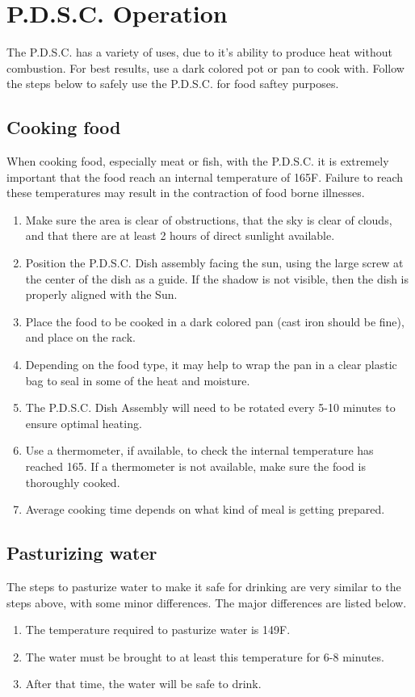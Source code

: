 \documentclass[titlepage]{article}
\begin{document}
    \section{P.D.S.C. Operation}
        The P.D.S.C. has a variety of uses, due to it's ability to produce heat without combustion.  For best results, use a dark colored pot or pan to cook with.
        Follow the steps below to safely use the P.D.S.C. for food saftey purposes.

        \subsection{Cooking food}
        When cooking food, especially meat or fish, with the P.D.S.C. it is extremely important that the food reach an internal temperature of 165\degree F.  Failure to reach these temperatures
        may result in the contraction of food borne illnesses.
            \begin{enumerate}
                \item Make sure the area is clear of obstructions, that the sky is clear of clouds, and that there are at least 2 hours of direct sunlight available.
                \item Position the P.D.S.C. Dish assembly facing the sun, using the large screw at the center of the dish as a guide.  If the shadow is not visible, then the dish is properly aligned with the Sun.
                \item Place the food to be cooked in a dark colored pan (cast iron should be fine), and place on the rack.
                \item Depending on the food type, it may help to wrap the pan in a clear plastic bag to seal in some of the heat and moisture.
                \item The P.D.S.C. Dish Assembly will need to be rotated every 5-10 minutes to ensure optimal heating.
                \item Use a thermometer, if available, to check the internal temperature has reached 165\degree.  If a thermometer is not available, make sure the food is thoroughly cooked.
                \item Average cooking time depends on what kind of meal is getting prepared.
            \end{enumerate}
        \subsection{Pasturizing water}
        The steps to pasturize water to make it safe for drinking are very similar to the steps above, with some minor differences.
        The major differences are listed below.
            \begin{enumerate}
                \item The temperature required to pasturize water is 149\degree F.
                \item The water must be brought to at least this temperature for 6-8 minutes.
                \item After that time, the water will be safe to drink.
            \end{enumerate}
\end{document}
